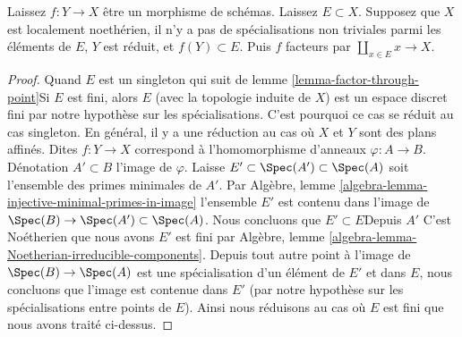 \begin{lemma}

\label{lemma-factor-through-set-of-points}
Laissez $f : Y \to X$ être un morphisme de schémas. Laissez $E \subset X$. Supposez que $X$ est localement noethérien, il n'y a pas de spécialisations non triviales parmi les éléments de $E$, $Y$ est réduit, et $f(Y) \subset E$. Puis $f$ facteurs par $\coprod_{x \in E} x \to X$.
\end{lemma}

\begin{proof}

Quand $E$ est un singleton qui suit de lemme \ref{lemma-factor-through-point}Si $E$ est fini, alors $E$
(avec la topologie induite de $X$) est un espace discret fini par notre hypothèse sur les spécialisations. C'est pourquoi ce cas se réduit au cas singleton. En général, il y a une réduction au cas où $X$ et $Y$ sont des plans affinés. Dites $f : Y \to X$ correspond à l'homomorphisme d'anneaux $\varphi : A \to B$. Dénotation $A' \subset B$ l'image de $\varphi$. Laisse $E' \subset \Spec(A') \subset \Spec(A)$ soit l'ensemble des primes minimales de $A'$. Par Algèbre, lemme \ref{algebra-lemma-injective-minimal-primes-in-image}
l'ensemble $E'$ est contenu dans l'image de
$\Spec(B) \to \Spec(A') \subset \Spec(A)$. Nous concluons que $E' \subset E$Depuis $A'$ C'est Noétherien que nous avons $E'$ est fini par Algèbre, lemme
\ref{algebra-lemma-Noetherian-irreducible-components}. Depuis tout autre point à l'image de $\Spec(B) \to \Spec(A)$ est une spécialisation d'un élément de $E'$ et dans $E$, nous concluons que l'image est contenue dans $E'$ (par notre hypothèse sur les spécialisations entre points de $E$). Ainsi nous réduisons au cas où
$E$ est fini que nous avons traité ci-dessus.

\end{proof}










